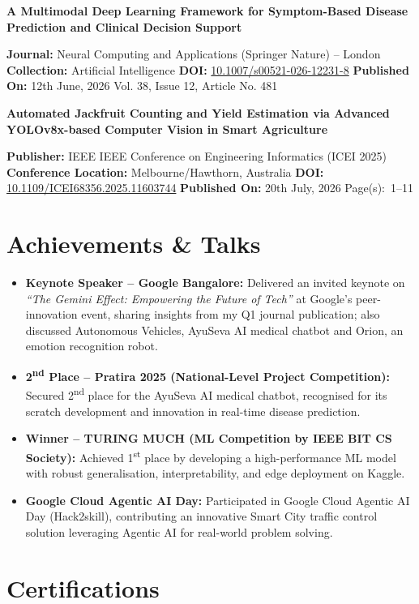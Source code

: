 \documentclass[letterpaper,10pt]{article}
\renewcommand{\small}{\fontsize{9}{11}\selectfont}
\renewcommand{\footnotesize}{\fontsize{8.5}{10.2}\selectfont}
\newcommand{\dsep}{\unskip\penalty0\hspace{0.35em}\textcolor{RuleGrey}{\textbar}\hspace{0.35em}\allowbreak}
\newcommand{\Pub}[3]{%
  \begin{list}{}{%
    \setlength{\leftmargin}{1.5em}\setlength{\labelwidth}{1.1em}%
    \setlength{\labelsep}{0.4em}\setlength{\itemindent}{0pt}%
    \setlength{\listparindent}{0pt}\setlength{\rightmargin}{0pt}%
    \setlength{\topsep}{3pt}\setlength{\parsep}{0pt}\setlength{\partopsep}{0pt}}
    \item[{\small\bfseries\color{AccentBlue}#1.}]%
      {\raggedright\small\bfseries\color{NavyBlue}#2\par}\vspace{2pt}
      {\raggedright\footnotesize\color{SubtleGrey}#3\par}
  \end{list}%
}
\newcommand{\Point}[1]{\item \small\RaggedRight #1}
\begin{document}
\Pub{2}{A Multimodal Deep Learning Framework for Symptom-Based Disease Prediction and Clinical Decision Support}{%
  \textbf{Journal:} Neural Computing and Applications (Springer Nature) -- London \dsep
  \textbf{Collection:} Artificial Intelligence \dsep
  \textbf{DOI:} \href{https://doi.org/10.1007/s00521-026-12231-8}{\color{SubtleGrey}10.1007/s00521-026-12231-8} \dsep
  \textbf{Published On:} 12th June, 2026 \dsep Vol. 38, Issue 12, Article No. 481}

\Pub{3}{Automated Jackfruit Counting and Yield Estimation via Advanced YOLOv8x-based Computer Vision in Smart Agriculture}{%
  \textbf{Publisher:} IEEE \dsep IEEE Conference on Engineering Informatics (ICEI 2025) \dsep
  \textbf{Conference Location:} Melbourne/Hawthorn, Australia \dsep
  \textbf{DOI:} \href{https://doi.org/10.1109/ICEI68356.2025.11603744}{\color{SubtleGrey}10.1109/ICEI68356.2025.11603744} \dsep
  \textbf{Published On:} 20th July, 2026 \dsep Page(s):~1--11}

\section{Achievements \& Talks}

\begin{itemize}
  \Point{\textbf{Keynote Speaker -- Google Bangalore:} Delivered an invited keynote on \textit{``The Gemini Effect: Empowering the Future of Tech''} at Google's peer-innovation event, sharing insights from my Q1 journal publication; also discussed Autonomous Vehicles, AyuSeva AI medical chatbot and Orion, an emotion recognition robot.}
  \Point{\textbf{2\textsuperscript{nd} Place -- Pratira 2025 (National-Level Project Competition):} Secured 2\textsuperscript{nd} place for the AyuSeva AI medical chatbot, recognised for its scratch development and innovation in real-time disease prediction.}
  \Point{\textbf{Winner -- TURING MUCH (ML Competition by IEEE BIT CS Society):} Achieved 1\textsuperscript{st} place by developing a high-performance ML model with robust generalisation, interpretability, and edge deployment on Kaggle.}
  \Point{\textbf{Google Cloud Agentic AI Day:} Participated in Google Cloud Agentic AI Day (Hack2skill), contributing an innovative Smart City traffic control solution leveraging Agentic AI for real-world problem solving.}
\end{itemize}

\section{Certifications}
\end{document}
